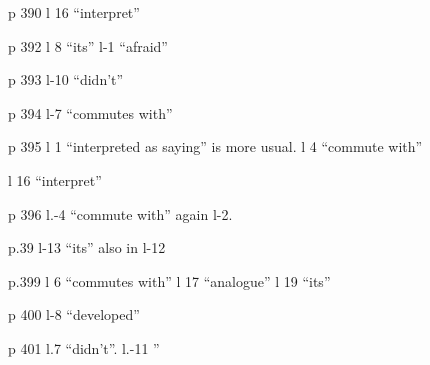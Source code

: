p 390 l 16 ``interpret''

p 392 l 8 ``its'' \quad l-1 ``afraid''

p 393 l-10 ``didn't''

p 394 l-7 ``commutes with''

p 395 l 1 ``interpreted as saying'' is more usual. \quad l 4 ``commute with''

l 16 ``interpret''

\normalmarginpar{}
p 396 l.-4 ``commute with'' again l-2.

p.39 l-13 ``its'' also in l-12

p.399 l 6 ``commutes with'' \quad l 17 ``analogue'' \quad l 19 ``its''

p 400 l-8 ``developed''

p 401 l.7 ``didn't''. \quad l.-11 ''
